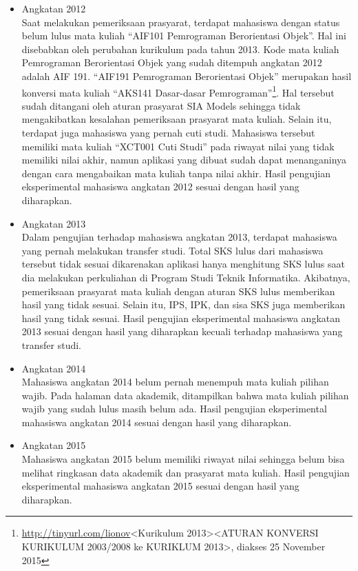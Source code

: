 		\begin{itemize}
			\item Angkatan 2012\\
			Saat melakukan pemeriksaan prasyarat, terdapat mahasiswa dengan status belum lulus mata kuliah ``AIF101 Pemrograman Berorientasi Objek''. Hal ini disebabkan oleh perubahan kurikulum pada tahun 2013. Kode mata kuliah Pemrograman Berorientasi Objek yang sudah ditempuh angkatan 2012 adalah AIF 191. ``AIF191 Pemrograman Berorientasi Objek'' merupakan hasil konversi mata kuliah ``AKS141 Dasar-dasar Pemrograman''\footnote{\url{http://tinyurl.com/lionov}<Kurikulum 2013><ATURAN KONVERSI 
KURIKULUM 2003/2008 ke KURIKLUM 2013>, diakses 25 November 2015}. Hal tersebut sudah ditangani oleh aturan prasyarat SIA Models sehingga tidak mengakibatkan kesalahan pemeriksaan prasyarat mata kuliah. Selain itu, terdapat juga mahasiswa yang pernah cuti studi. Mahasiswa tersebut memiliki mata kuliah ``XCT001 Cuti Studi'' pada riwayat nilai yang tidak memiliki nilai akhir, namun aplikasi yang dibuat sudah dapat menanganinya dengan cara mengabaikan mata kuliah tanpa nilai akhir. Hasil pengujian eksperimental mahasiswa angkatan 2012 sesuai dengan hasil yang diharapkan.
			\item Angkatan 2013\\
			Dalam pengujian terhadap mahasiswa angkatan 2013, terdapat mahasiswa yang pernah melakukan transfer studi. Total SKS lulus dari mahasiswa tersebut tidak sesuai dikarenakan aplikasi hanya menghitung SKS lulus saat dia melakukan perkuliahan di Program Studi Teknik Informatika. Akibatnya, pemeriksaan prasyarat mata kuliah dengan aturan SKS lulus memberikan hasil yang tidak sesuai. Selain itu, IPS, IPK, dan sisa SKS juga memberikan hasil yang tidak sesuai. Hasil pengujian eksperimental mahasiswa angkatan 2013 sesuai dengan hasil yang diharapkan kecuali terhadap mahasiswa yang transfer studi.
			\item Angkatan 2014\\
			Mahasiswa angkatan 2014 belum pernah menempuh mata kuliah pilihan wajib. Pada halaman data akademik, ditampilkan bahwa mata kuliah pilihan wajib yang sudah lulus masih belum ada. Hasil pengujian eksperimental mahasiswa angkatan 2014 sesuai dengan hasil yang diharapkan.
			\item Angkatan 2015\\
			Mahasiswa angkatan 2015 belum memiliki riwayat nilai sehingga belum bisa melihat ringkasan data akademik dan prasyarat mata kuliah. Hasil pengujian eksperimental mahasiswa angkatan 2015 sesuai dengan hasil yang diharapkan.
		\end{itemize}
		
